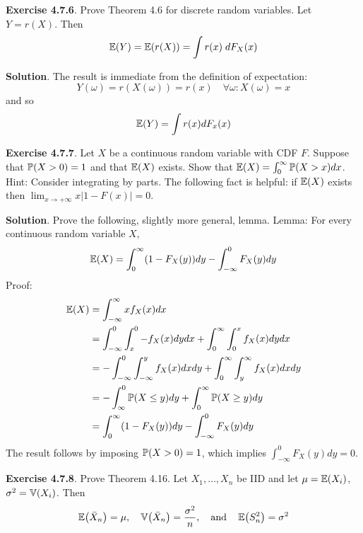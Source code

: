 \textbf{Exercise 4.7.6}. Prove Theorem 4.6 for discrete random
variables.
Let \(Y = r(X)\). Then
\[
\operatorname{\mathbb{E}}(Y) = \operatorname{\mathbb{E}}(r(X)) = \int r(x) \; dF_X(x)
\]

\textbf{Solution}. The result is immediate from the definition of
expectation:
\[
Y(\omega) = r(X(\omega)) = r(x) \quad \forall \omega : X(\omega) = x
\]
and so
\[
\operatorname{\mathbb{E}}(Y) = \int r(x) dF_x(x)
\]

\textbf{Exercise 4.7.7}. Let \(X\) be a continuous random variable with
CDF \(F\). Suppose that \(\operatorname{\mathbb{P}}(X > 0) = 1\) and that
\(\operatorname{\mathbb{E}}(X)\) exists. Show that
\(\operatorname{\mathbb{E}}(X) = \int_{0}^{\infty} \operatorname{\mathbb{P}}(X > x) dx\).
Hint: Consider integrating by parts. The following fact is helpful: if
\(\operatorname{\mathbb{E}}(X)\) exists then
\(\lim_{x \rightarrow +\infty} x | 1 - F(x) | = 0\).

\textbf{Solution}. Prove the following, slightly more general,
lemma.
Lemma: For every continuous random variable \(X\),
\[
\operatorname{\mathbb{E}}(X) = \int_{0}^{\infty} (1 - F_X(y)) dy - \int_{-\infty}^{0} F_X(y) dy
\]
Proof:
\begin{align*}
\operatorname{\mathbb{E}}(X) &= \int_{-\infty}^{\infty} x f_X(x) dx \\
&= \int_{-\infty}^{0} \int_x^{0} -f_X(x) dy dx + \int_{0}^{\infty} \int_{0}^x f_X(x) dy dx \\
&= -\int_{-\infty}^{0} \int_{-\infty}^y f_X(x) dx dy + \int_{0}^{\infty} \int_y^{\infty} f_X(x) dx dy \\
&= -\int_{\infty}^{0} \operatorname{\mathbb{P}}(X \leq y) dy + \int_{0}^{\infty} \operatorname{\mathbb{P}}(X \geq y) dy \\
&= \int_{0}^{\infty} (1 - F_X(y)) dy - \int_{-\infty}^{0} F_X(y) dy
\end{align*}
The result follows by imposing \(\operatorname{\mathbb{P}}(X > 0) = 1\), which implies
\(\int_{-\infty}^{0} F_X(y) dy = 0\).

\textbf{Exercise 4.7.8}. Prove Theorem 4.16.
Let \(X_{1}, \dots, X_{n}\) be IID and let \(\mu = \operatorname{\mathbb{E}}(X_{i})\),
\(\sigma^{2} = \operatorname{\mathbb{V}}(X_{i})\). Then
\[
\EXP\left(\bar{X}_{n}\right) = \mu,
\quad
\VAR\left(\bar{X}_{n}\right) = \frac{\sigma^{2}}{n},
\quad \text{and} \quad
\EXP\left(S_{n}^{2}\right) = \sigma^{2}
\]

